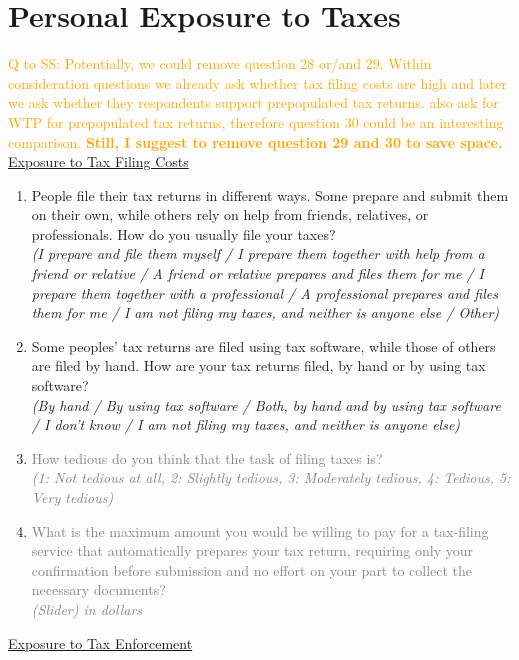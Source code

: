 \documentclass[11pt]{article}
\newcommand{\tk}[1]{\textcolor{orange}{#1}}
\begin{document}
\section*{Personal Exposure to Taxes}
\tk{Q to SS: Potentially, we could remove question 28 or/and 29. Within consideration questions we already ask whether tax filing costs are high and later we ask whether they respondents support prepopulated tax returns. \cite{benzarti2024rising} also ask for WTP for prepopulated tax returns, therefore question 30 could be an interesting comparison. \textbf{Still, I suggest to remove question 29 and 30 to save space.}} \\
\underline{Exposure to Tax Filing Costs}
\begin{enumerate}[resume]
    \item People file their tax returns in different ways. Some prepare and submit them on their own, while others rely on help from friends, relatives, or professionals. How do you usually file your taxes?\\ 
    \textit{(I prepare and file them myself / I prepare them together with help from a friend or relative /  A friend or relative prepares and files them for me / I prepare them together with a professional / A professional prepares and files them for me / I am not filing my taxes, and neither is anyone else / Other)}
    \item Some peoples' tax returns are filed using tax software, while those of others are filed by hand. How are your tax returns filed, by hand or by using tax software? \\ 
    \textit{(By hand / By using tax software / Both, by hand and by using tax software / I don't know / I am not filing my taxes, and neither is anyone else)}
    \item[\sout{\theenumi.}] \textcolor{gray}{How tedious do you think that the task of filing taxes is? \\ \textit{(1: Not tedious at all, 2: Slightly tedious, 3: Moderately tedious, 4: Tedious, 5: Very tedious)}} 
    \item[\sout{\theenumi.}] \textcolor{gray}{What is the maximum amount you would be willing to pay for a tax-filing service that automatically prepares your tax return, requiring only your confirmation before submission and no effort on your part to collect the necessary documents? \\
    \textit{(Slider) in dollars}}
\end{enumerate}
\underline{Exposure to Tax Enforcement}
\end{document}
